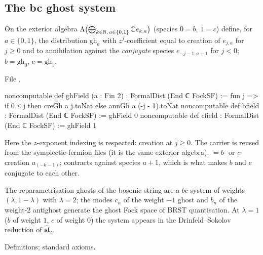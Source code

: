 \subsection{The bc ghost system}\label{l17:sec:bc}

\begin{definition}[$bc$ fields]\label{l17:def:bc}
On the exterior algebra $\Lambda\bigl(\bigoplus_{k\in{\mathbb{N}},\,a\in\{0,1\}}{\mathbb{C}} e_{k,a}\bigr)$ (species $0=b$,
$1=c$) define, for $a\in\{0,1\}$, the distribution $\mathrm{gh}_a$ with $z^j$-coefficient equal to
creation of $e_{j,a}$ for $j\ge0$ and to annihilation against the \emph{conjugate} species $e_{-j-1,a+1}$
for $j<0$; $b=\mathrm{gh}_0$, $c=\mathrm{gh}_1$.
\end{definition}
\noindent File .
\begin{leancode}
noncomputable def ghField (a : Fin 2) : FormalDist (End ℂ FockSF) :=
  fun j => if 0 ≤ j then creGh a j.toNat else annGh a (-j - 1).toNat
noncomputable def bfield : FormalDist (End ℂ FockSF) := ghField 0
noncomputable def cfield : FormalDist (End ℂ FockSF) := ghField 1
\end{leancode}
\begin{dictionary}
Here the $z$-exponent indexing is respected: creation at $j\ge0$. The carrier  is reused
from the symplectic-fermion files (it is the same exterior algebra).  $=b$- or
$c$-creation $a_{(-k-1)}$;  contracts against species $a+1$, which is what makes $b$
and $c$ conjugate to each other.
\end{dictionary}
\begin{physics}
The reparametrisation ghosts of the bosonic string are a $bc$ system of weights $(\lambda,1-\lambda)$
with $\lambda=2$; the modes $c_n$ of the weight $-1$ ghost and $b_n$ of the weight-$2$ antighost
generate the ghost Fock space of BRST quantisation. At $\lambda=1$ ($b$ of weight $1$, $c$ of
weight $0$) the system appears in the Drinfeld--Sokolov reduction of $\widehat{\mathfrak{sl}}_2$.
\end{physics}
\begin{status}
Definitions; standard axioms.
\end{status}

